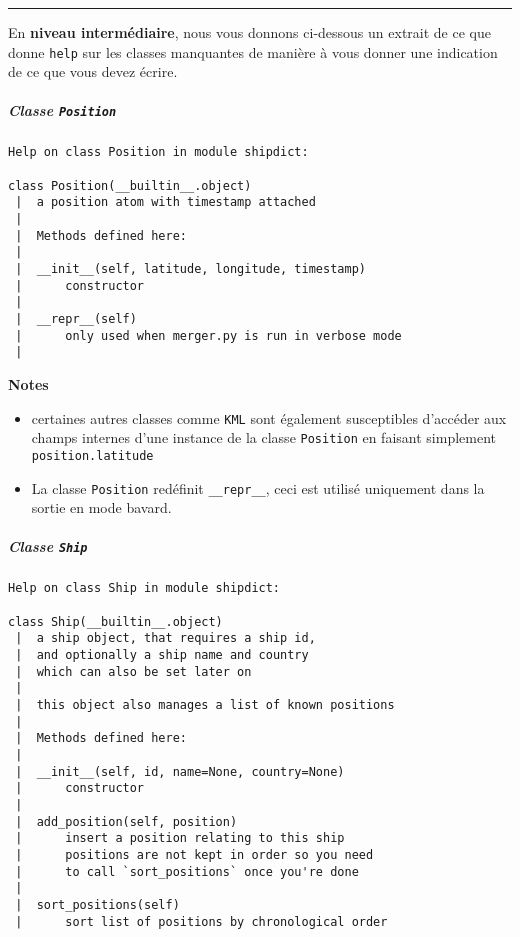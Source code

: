     \begin{center}\rule{0.5\linewidth}{\linethickness}\end{center}

    En \textbf{niveau intermédiaire}, nous vous donnons ci-dessous un
extrait de ce que donne \texttt{help} sur les classes manquantes de
manière à vous donner une indication de ce que vous devez écrire.

    \hypertarget{classe-position}{%
\subparagraph{\texorpdfstring{Classe
\texttt{Position}}{Classe Position}}\label{classe-position}}

    \begin{verbatim}
Help on class Position in module shipdict:

class Position(__builtin__.object)
 |  a position atom with timestamp attached
 |  
 |  Methods defined here:
 |  
 |  __init__(self, latitude, longitude, timestamp)
 |      constructor
 |  
 |  __repr__(self)
 |      only used when merger.py is run in verbose mode
 |  
\end{verbatim}

    \textbf{Notes}

\begin{itemize}
\tightlist
\item
  certaines autres classes comme \texttt{KML} sont également
  susceptibles d'accéder aux champs internes d'une instance de la classe
  \texttt{Position} en faisant simplement \texttt{position.latitude}
\item
  La classe \texttt{Position} redéfinit \texttt{\_\_repr\_\_}, ceci est
  utilisé uniquement dans la sortie en mode bavard.
\end{itemize}

    \hypertarget{classe-ship}{%
\subparagraph{\texorpdfstring{Classe
\texttt{Ship}}{Classe Ship}}\label{classe-ship}}

    \begin{verbatim}
Help on class Ship in module shipdict:

class Ship(__builtin__.object)
 |  a ship object, that requires a ship id, 
 |  and optionally a ship name and country
 |  which can also be set later on
 |  
 |  this object also manages a list of known positions
 |  
 |  Methods defined here:
 |  
 |  __init__(self, id, name=None, country=None)
 |      constructor
 |  
 |  add_position(self, position)
 |      insert a position relating to this ship
 |      positions are not kept in order so you need 
 |      to call `sort_positions` once you're done
 |  
 |  sort_positions(self)
 |      sort list of positions by chronological order
\end{verbatim}

